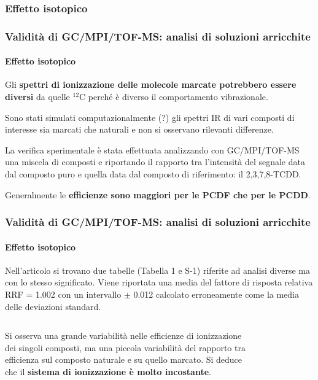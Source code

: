 \subsubsection{Effetto isotopico}\begin{frame}\frametitle{Validità di GC/MPI/TOF-MS: analisi di soluzioni arricchite}\framesubtitle{Effetto isotopico}
Gli {\bf spettri di ionizzazione delle molecole marcate potrebbero essere diversi} da quelle $^{12}$C perché è diverso il comportamento vibrazionale.
\pause

Sono stati simulati computazionalmente (?) gli spettri IR di vari composti di interesse sia marcati che naturali e non si osservano rilevanti differenze.

La verifica sperimentale è stata effettuata analizzando con GC/MPI/TOF-MS una miscela di composti e riportando il rapporto tra l'intensità del segnale data dal composto puro e quella data dal composto di riferimento: il 2,3,7,8-TCDD.

Generalmente le {\bf efficienze sono maggiori per le PCDF che per le PCDD}.
\end{frame}
\begin{frame}\frametitle{Validità di GC/MPI/TOF-MS: analisi di soluzioni arricchite}\framesubtitle{Effetto isotopico}\pause
Nell'articolo si trovano due tabelle (Tabella 1 e S-1) riferite ad analisi diverse ma con lo stesso significato. Viene riportata una media del fattore di risposta relativa RRF = 1.002 con un intervallo $\pm$ 0.012 calcolato erroneamente come la media delle deviazioni standard.  
\begin{columns}
Si osserva una grande variabilità nelle efficienze di ionizzazione dei singoli composti, ma una piccola variabilità del rapporto tra efficienza sul composto naturale e su quello marcato. Si deduce che il {\bf sistema di ionizzazione è molto incostante}.
\begin{figure}{}\end{figure}
\end{columns}

\end{frame}
